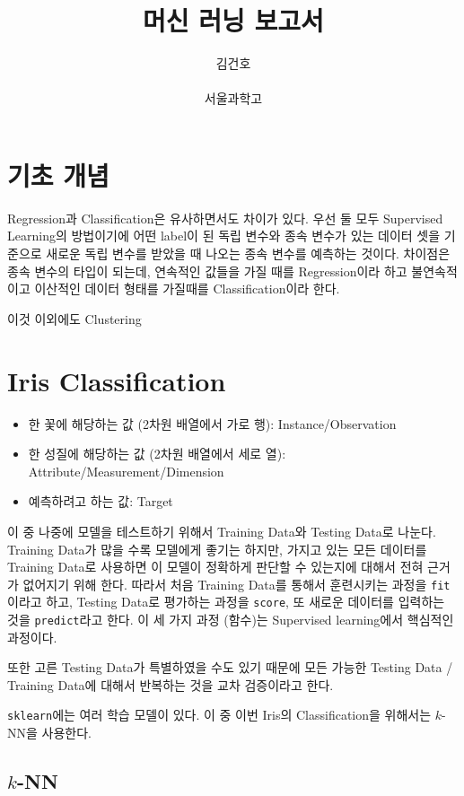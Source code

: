 \documentclass[]{sptr_article}
\title{\textbf{머신 러닝 보고서}}
\author{김건호 \\ \phantom{m} \\ \normalsize 서울과학고} %
\date{}
\begin{document}
\maketitle

\tableofcontents

\section{기초 개념}

Regression과 Classification은 유사하면서도 차이가 있다.
우선 둘 모두 Supervised Learning의 방법이기에 어떤 label이 된 독립 변수와 종속 변수가 있는 데이터 셋을 기준으로
새로운 독립 변수를 받았을 때 나오는 종속 변수를 예측하는 것이다. 
차이점은 종속 변수의 타입이 되는데, 연속적인 값들을 가질 때를 Regression이라 하고 불연속적이고 이산적인 데이터 형태를 가질때를 Classification이라 한다.

이것 이외에도 Clustering%

\section{Iris Classification}

\begin{itemize}
    \item 한 꽃에 해당하는 값 (2차원 배열에서 가로 행): Instance/Observation
    \item 한 성질에 해당하는 값 (2차원 배열에서 세로 열): Attribute/Measurement/Dimension
    \item 예측하려고 하는 값: Target
\end{itemize}

이 중 나중에 모델을 테스트하기 위해서 Training Data와 Testing Data로 나눈다. 
Training Data가 많을 수록 모델에게 좋기는 하지만, 가지고 있는 모든 데이터를 Training Data로 사용하면 이 모델이 정확하게 판단할 수 있는지에 대해서 전혀 근거가 없어지기 위해 한다.
따라서 처음 Training Data를 통해서 훈련시키는 과정을 \texttt{fit}이라고 하고, Testing Data로 평가하는 과정을 \texttt{score}, 또 새로운 데이터를 입력하는 것을 \texttt{predict}라고 한다.
이 세 가지 과정 (함수)는 Supervised learning에서 핵심적인 과정이다.

또한 고른 Testing Data가 특별하였을 수도 있기 때문에 모든 가능한 Testing Data / Training Data에 대해서 반복하는 것을 교차 검증이라고 한다. 

\texttt{sklearn}에는 여러 학습 모델이 있다. 이 중 이번 Iris의 Classification을 위해서는 $k$-NN을 사용한다. 

\subsection{$k$-NN}
\end{document}
